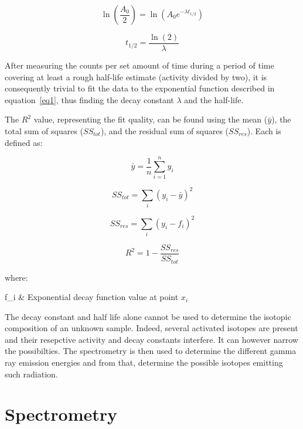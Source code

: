 \begin{equation}\label{eq3}
\ln(\frac{A_0}{2}) = \ln(A_0 e^{-\lambda t_{1/2}})
\end{equation}

\begin{equation}\label{eq4}
t_{1/2} = \frac{\ln(2)}{\lambda}
\end{equation}

After measuring the counts per set amount of time during a period of time covering at least a rough half-life estimate (activity divided by two), it is consequently trivial to fit the data to the exponential function described in equation~\ref{eq1}, thus finding the decay constant $\lambda$ and the half-life.

The $R^2$ value, representing the fit quality, can be found using the mean ($\bar{y}$), the total sum of squares ($SS_{tot}$), and the residual sum of squares ($SS_{res}$). Each is defined as:

\begin{equation}\label{eq5}
\bar{y} = \frac{1}{n}\sum\limits_{i=1}^{n}{y_i}
\end{equation}

\begin{equation}\label{eq6}
SS_{tot} = \sum_{i}{(y_i-\bar{y})^2}
\end{equation}

\begin{equation}\label{eq7}
SS_{res} = \sum_{i}{(y_i-f_i)^2}
\end{equation}

\begin{equation}\label{eq8}
R^2 = 1 - \frac{SS_{res}}{SS_{tot}}
\end{equation}

where:

\begin{conditions}
 f_i  &  Exponential decay function value at point $x_i$
\end{conditions}

The decay constant and half life alone cannot be used to determine the isotopic composition of an unknown sample. Indeed, several activated isotopes are present and their resepctive activity and decay constants interfere. It can however narrow the possibilties. The spectrometry is then used to determine the different gamma ray emission energies and from that, determine the possible isotopes emitting such radiation.

\section{Spectrometry}
\label{sec:spectro}

